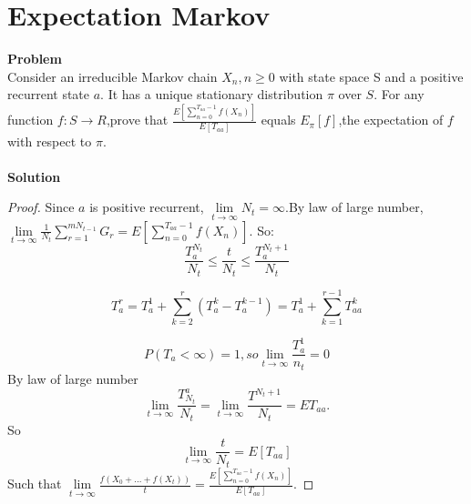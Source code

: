	\section{Expectation Markov}
	\textbf{Problem}\\
	Consider an irreducible Markov chain ${X_n, n \geq 0}$ with state space S and a positive recurrent state $a$. It has a unique stationary distribution $\pi$ over $S$. For any function $f:S \rightarrow R$,prove that $\frac{E[\sum_{n=0}^{T_{aa}-1}f(X_n)]}{E[T_{aa}]}$ equals $E_\pi[f]$,the expectation of $f$ with respect to $\pi$.\\\\
	\textbf{Solution}\\
	\begin{proof}
		Since $a$ is positive recurrent, $\lim\limits_{t \rightarrow \infty}N_t = \infty$.By law of large number,$\lim\limits_{t \rightarrow \infty}\frac{1}{N_t}\sum_{r=1}^{mN_{t-1}}G_r=E \left[\sum_{n=0}^{T_{aa}-1}f(X_n)\right]$.
	So:
	\[
	\frac{T^{N_t}_a}{N_t} \leq \frac{t}{N_t} \leq \frac{T^{N_t+1}_a}{N_t}
	\]
	
	\[
	T^r_a = T^1_a+\sum_{k=2}^{r}(T^k_a-T^{k-1}_a)=T^1_a+\sum_{k=1}^{r-1}T^k_{aa}
	\]
	
	\[
	P(T_a<\infty)=1,so \lim\limits_{t \rightarrow \infty}\frac{T^1_a}{n_t}=0
	\]
	By law of large number
	\[
	\lim\limits_{t \rightarrow \infty}\frac{T^a_{N_t}}{N_t}=\lim\limits_{t \rightarrow \infty} \frac{T^{N_t+1}}{N_t}=E{T_{aa}}.
	\]
	So
	\[
	\lim\limits_{t \rightarrow \infty}\frac{t}{N_t}=E[T_{aa}] 
	\]
	Such that $\lim\limits_{t \rightarrow \infty}\frac{f(X_0+...+f(X_t))}{t}=\frac{E\left[\sum_{n=0}^{T_{aa}-1}f(X_n)\right]}{E[T_{aa}]}$.
	\end{proof}
	
